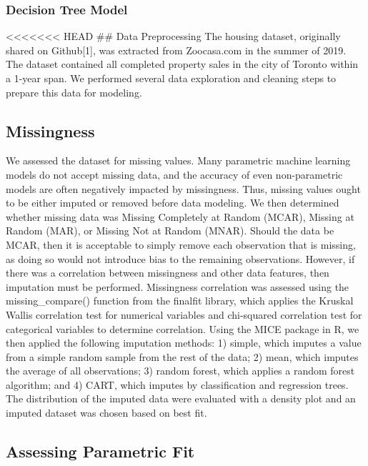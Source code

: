 \documentclass[11pt,]{article}
\begin{document}
\hypertarget{decision-tree-model}{%
\subsubsection{\texorpdfstring{\textbf{Decision Tree Model}\\
}{Decision Tree Model }}\label{decision-tree-model}}

\textless\textless\textless\textless\textless\textless\textless{} HEAD
\#\# Data Preprocessing The housing dataset, originally shared on
Github{[}1{]}, was extracted from Zoocasa.com in the summer of 2019. The
dataset contained all completed property sales in the city of Toronto
within a 1-year span. We performed several data exploration and cleaning
steps to prepare this data for modeling.

\hypertarget{missingness-1}{%
\subsection{Missingness}\label{missingness-1}}

We assessed the dataset for missing values. Many parametric machine
learning models do not accept missing data, and the accuracy of even
non-parametric models are often negatively impacted by missingness.
Thus, missing values ought to be either imputed or removed before data
modeling. We then determined whether missing data was Missing Completely
at Random (MCAR), Missing at Random (MAR), or Missing Not at Random
(MNAR). Should the data be MCAR, then it is acceptable to simply remove
each observation that is missing, as doing so would not introduce bias
to the remaining observations. However, if there was a correlation
between missingness and other data features, then imputation must be
performed. Missingness correlation was assessed using the
missing\_compare() function from the finalfit library, which applies the
Kruskal Wallis correlation test for numerical variables and chi-squared
correlation test for categorical variables to determine correlation.
Using the MICE package in R, we then applied the following imputation
methods: 1) simple, which imputes a value from a simple random sample
from the rest of the data; 2) mean, which imputes the average of all
observations; 3) random forest, which applies a random forest algorithm;
and 4) CART, which imputes by classification and regression trees. The
distribution of the imputed data were evaluated with a density plot and
an imputed dataset was chosen based on best fit.

\hypertarget{assessing-parametric-fit}{%
\subsection{Assessing Parametric Fit}\label{assessing-parametric-fit}}
\end{document}
